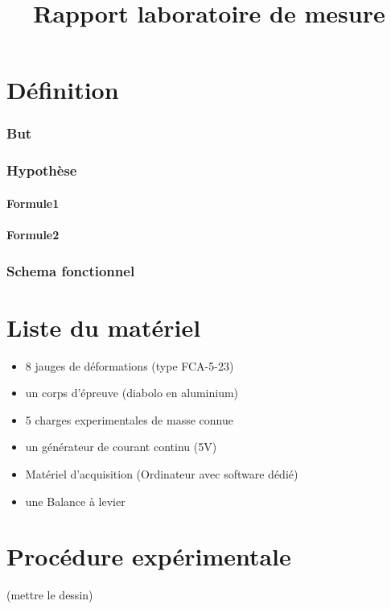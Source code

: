 \documentclass[11pt,a4paper]{report}
\begin{document}
\title{Rapport laboratoire de mesure}


\chapter{Définition}	
\subsection{But}
\subsection{Hypothèse}
\subsubsection{Formule1}
\subsubsection{Formule2}
\subsection{Schema fonctionnel}

\chapter{Liste du matériel}
\begin{itemize}
\item 8 jauges de déformations (type FCA-5-23)
\item un corps d'épreuve (diabolo en aluminium)
\item 5 charges experimentales de masse connue
\item un générateur de courant continu (5V)
\item Matériel d'acquisition (Ordinateur avec software dédié)
\item une Balance à levier
\end{itemize}	

\chapter{Procédure expérimentale}

(mettre le dessin)
\end{document}
